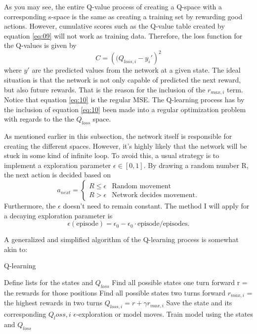\documentclass[%
 uio,
 jmp,
 amsmath,amssymb,
 reprint, nofootinbib]{revtex4-1}
\numberwithin{equation}{section}
\newcommand{\lp}{\left(}
\newcommand{\rp}{\right)}
\begin{document}
As you may see, the entire Q-value process of creating a Q-space with a corresponding s-space is the same as creating a training set by rewarding good actions. However, cumulative scores such as the Q-value table created by equation \ref{eq:09} will not work as training data. Therefore, the loss function for the Q-values is given by
\begin{equation}\label{eq:10}
C = \lp (Q_{loss, i} - y_i'\rp^2
\end{equation}
where \(y'\) are the predicted values from the network at a given state. The ideal situation is that the network is not only capable of predicted the next reward, but also future rewards. That is the reason for the inclusion of the \(r_{max,i}\) term. Notice that equation \ref{eq:10} is the regular MSE. The Q-learning process has by the inclusion of equation \ref{eq:10} been made into a regular optimization problem with regards to the the \(Q_{loss}\) space.

As mentioned earlier in this subsection, the network itself is responsible for creating the different spaces. However, it's highly likely that the network will be stuck in some kind of infinite loop. To avoid this, a usual strategy is to implement a exploration parameter \(\epsilon\in [0,1]\). By drawing a random number R, the next action is decided based on
\begin{equation}
a_{next} =
\begin{cases} 
  R \leq \epsilon & \text{Random movement} \\ 
  R > \epsilon & \text{Network decides movement}.
\end{cases}
\end{equation}
Furthermore, the \(\epsilon\) doesn't need to remain constant. The method I will apply for a decaying exploration parameter is
\begin{equation}
\epsilon(\text{episode}) = \epsilon_0 - \epsilon_0\cdot\text{episode}/\text{episodes}.
\end{equation}

A generalized and simplified algorithm of the Q-learning process is somewhat akin to:

\begin{algorithm}[H]
\caption{Q-learning}
\begin{algorithmic}
\State Define lists for the states and \(Q_{loss}\)
\State Find all possible states one turn forward
\State r = the rewards for those positions
\State Find all possible states two turns forward
\State \(r_{max, i}\) = the highest rewards in two turns
\State \(Q_{loss, i} = r + \gamma r_{max, i}\)
\State Save the state and its corresponding \(Q_loss, i\)
\State \(\epsilon\)-exploration or model moves.
\EndWhile
\State Train model using the states and \(Q_{loss}\)
\EndFor
\end{algorithmic}
\label{alg:01}
\end{algorithm}
\end{document}
